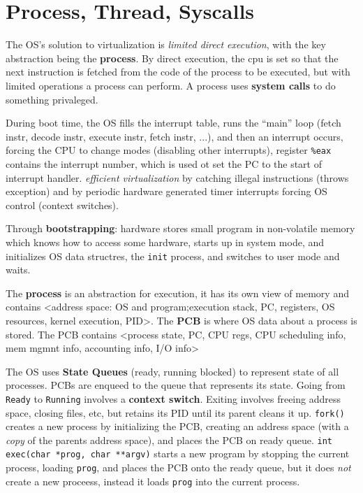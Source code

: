 \section{Process, Thread, Syscalls}


The OS's solution to virtualization is \textit{limited direct execution},
with the key abstraction being the \textbf{process}. By direct execution, the
cpu is set so that the next instruction is fetched from the code of the process
to be executed, but with limited operations a process can perform. A process uses
\textbf{system calls} to do something privaleged.

During boot time, the OS fills the interrupt table, runs the ``main'' loop
(fetch instr, decode instr, execute instr, fetch instr, ...), and then an
interrupt occurs, forcing the CPU to change modes (disabling other interrupts),
register {\tt \%eax} contains the interrupt number, which is used ot set the PC
to the start of interrupt handler. \textit{efficient virtualization} by
catching illegal instructions (throws exception) and by periodic hardware
generated timer interrupts forcing OS control (context switches).

Through \textbf{bootstrapping}: hardware stores small program in non-volatile
memory which knows how to access some hardware, starts up in system mode, and
initializes OS data structres, the {\tt init} process, and switches to user
mode and waits.

The  \textbf{process} is an abstraction for execution, it has its own view of
memory and contains <address space: OS and program;execution stack, PC,
registers, OS resources, kernel execution, PID>. The \textbf{PCB} is where OS
data about a process is stored. The PCB contains <process state, PC, CPU regs,
CPU scheduling info, mem mgmnt info, accounting info, I/O info>

The OS uses \textbf{State Queues} (ready, running blocked) to represent state
of all processes. PCBs are enqueed to the queue that represents its state. Going
from {\tt Ready} to {\tt Running} involves a \textbf{context switch}. Exiting
involves freeing address space, closing files, etc, but retains its PID until
its parent cleans it up. {\tt fork() } creates a new process by initializing the
PCB, creating an address space (with a \textit{copy} of the parents address
space), and places the PCB on ready queue. {\tt int exec(char *prog, char **argv)}
starts a new program by stopping the current process, loading {\tt prog}, and
places the PCB onto the ready queue, but it does \textit{not} create a new
proceess, instead it loads {\tt prog} into the current process.

